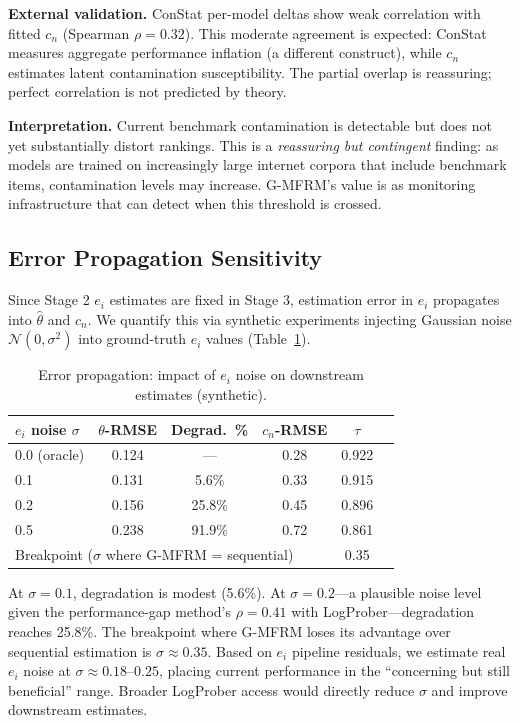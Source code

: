 \documentclass[11pt]{article}
\newcommand{\gmfrm}{G-MFRM}
\newcommand{\thetahat}{\hat{\theta}}
\newcommand{\cn}{c_n}
\newcommand{\ei}{e_i}
\begin{document}
\textbf{External validation.} ConStat per-model deltas show weak correlation with fitted $\cn$ (Spearman $\rho = 0.32$). This moderate agreement is expected: ConStat measures aggregate performance inflation (a different construct), while $\cn$ estimates latent contamination susceptibility. The partial overlap is reassuring; perfect correlation is not predicted by theory.

\textbf{Interpretation.} Current benchmark contamination is detectable but does not yet substantially distort rankings. This is a \emph{reassuring but contingent} finding: as models are trained on increasingly large internet corpora that include benchmark items, contamination levels may increase. \gmfrm{}'s value is as monitoring infrastructure that can detect when this threshold is crossed.

\subsection{Error Propagation Sensitivity}
\label{sec:error_prop}

Since Stage 2 $\ei$ estimates are fixed in Stage 3, estimation error in $\ei$ propagates into $\thetahat$ and $\cn$. We quantify this via synthetic experiments injecting Gaussian noise $\mathcal{N}(0, \sigma^2)$ into ground-truth $\ei$ values (Table~\ref{tab:error_prop}).

\begin{table}[t]
\centering
\caption{Error propagation: impact of $\ei$ noise on downstream estimates (synthetic).}
\label{tab:error_prop}
\small
\begin{tabular}{lccccc}
\toprule
$\ei$ noise $\sigma$ & $\theta$-RMSE & Degrad.\ \% & $\cn$-RMSE & $\tau$ \\
\midrule
0.0 (oracle) & 0.124 & --- & 0.28 & 0.922 \\
0.1 & 0.131 & 5.6\% & 0.33 & 0.915 \\
0.2 & 0.156 & 25.8\% & 0.45 & 0.896 \\
0.5 & 0.238 & 91.9\% & 0.72 & 0.861 \\
\midrule
\multicolumn{4}{l}{Breakpoint ($\sigma$ where \gmfrm{} = sequential)} & \multicolumn{1}{c}{0.35} \\
\bottomrule
\end{tabular}
\end{table}

At $\sigma = 0.1$, degradation is modest (5.6\%). At $\sigma = 0.2$---a plausible noise level given the performance-gap method's $\rho = 0.41$ with LogProber---degradation reaches 25.8\%. The breakpoint where \gmfrm{} loses its advantage over sequential estimation is $\sigma \approx 0.35$. Based on $\ei$ pipeline residuals, we estimate real $\ei$ noise at $\sigma \approx 0.18$--$0.25$, placing current performance in the ``concerning but still beneficial'' range. Broader LogProber access would directly reduce $\sigma$ and improve downstream estimates.
\end{document}
